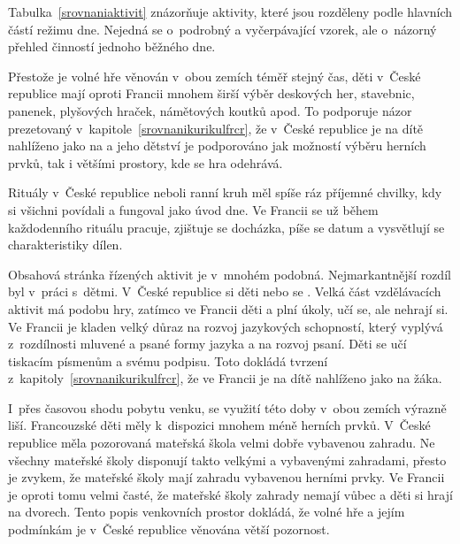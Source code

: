 	Tabulka~\ref{srovnaniaktivit} znázorňuje aktivity, které jsou rozděleny podle hlavních částí režimu dne. Nejedná se o~podrobný a vyčerpávající vzorek, ale o~názorný přehled činností jednoho běžného dne. 

	Přestože je volné hře věnován v~obou zemích téměř stejný čas, děti v~České republice mají oproti Francii mnohem širší výběr deskových her, stavebnic, panenek, plyšových hraček, námětových koutků apod. To podporuje názor prezetovaný v~kapitole~\ref{srovnanikurikulfrcr}, že v~České republice je na dítě nahlíženo jako na  a jeho dětství je podporováno jak možností výběru herních prvků, tak i většími prostory, kde se hra odehrává. 

	Rituály v~České republice neboli ranní kruh měl spíše ráz příjemné chvilky, kdy si všichni povídali a fungoval jako úvod dne. Ve Francii se už během každodenního rituálu pracuje, zjištuje se docházka, píše se datum a vysvětlují se charakteristiky dílen.

	Obsahová stránka řízených aktivit je v~mnohém podobná. Nejmarkantnější rozdíl byl v~práci s~dětmi. V~České republice si děti  nebo se . Velká část vzdělávacích aktivit má podobu hry, zatímco ve Francii děti  a plní úkoly, učí se, ale nehrají si. Ve Francii je kladen velký důraz na rozvoj jazykových schopností, který vyplývá z~rozdílnosti mluvené a psané formy jazyka a na rozvoj psaní. Děti se učí tiskacím písmenům a svému podpisu. Toto dokládá tvrzení z~kapitoly~\ref{srovnanikurikulfrcr}, že ve Francii je na dítě nahlíženo jako na žáka.

	I~přes časovou shodu pobytu venku, se využití této doby v~obou zemích výrazně liší. Francouzské děti měly k~dispozici mnohem méně herních prvků. V~České republice měla pozorovaná mateřská škola velmi dobře vybavenou zahradu. Ne všechny mateřské školy disponují takto velkými a vybavenými zahradami, přesto je zvykem, že mateřské školy mají zahradu vybavenou herními prvky. Ve Francii je oproti tomu velmi časté, že mateřské školy zahrady nemají vůbec a děti si hrají na dvorech. Tento popis venkovních prostor dokládá, že volné hře a jejím podmínkám je v~České republice věnována větší pozornost.



		
	


